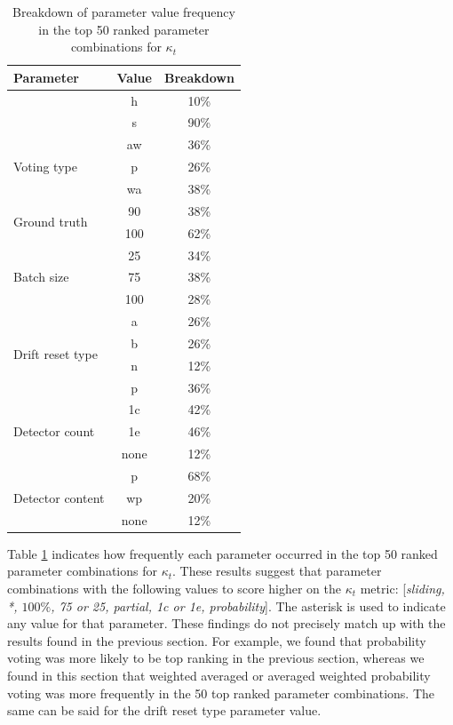 \begin{table}[]
\centering
\caption{\label{table:rank_kappa_breakdown}Breakdown of parameter value frequency in the top 50 ranked parameter combinations for $\kappa_t$}
\begin{tabular}{|l|c|c|}
\hline
\textbf{Parameter} & \textbf{Value} & \textbf{Breakdown} \\ \hline \hhline{===}
\multirow{2}{*}{Sliding type} & h & 10\% \\ \cline{2-3} 
 & s & 90\% \\ \hline
\multirow{3}{*}{Voting type} & aw & 36\% \\ \cline{2-3} 
 & p & 26\% \\ \cline{2-3} 
 & wa & 38\% \\ \hline
\multirow{2}{*}{Ground truth} & 90 & 38\% \\ \cline{2-3} 
 & 100 & 62\% \\ \hline
\multirow{3}{*}{Batch size} & 25 & 34\% \\ \cline{2-3} 
 & 75 & 38\% \\ \cline{2-3} 
 & 100 & 28\% \\ \hline
\multirow{4}{*}{Drift reset type} & a & 26\% \\ \cline{2-3} 
 & b & 26\% \\ \cline{2-3} 
 & n & 12\% \\ \cline{2-3} 
 & p & 36\% \\ \hline
\multirow{3}{*}{Detector count} & 1c & 42\% \\ \cline{2-3} 
 & 1e & 46\% \\ \cline{2-3} 
 & none & 12\% \\ \hline
\multirow{3}{*}{Detector content} & p & 68\% \\ \cline{2-3} 
 & wp & 20\% \\ \cline{2-3} 
 & none & 12\% \\ \hline
\end{tabular}
\end{table}

Table \ref{table:rank_kappa_breakdown} indicates how frequently each parameter occurred in the top 50 ranked parameter combinations for $\kappa_t$. These results suggest that parameter combinations with the following values to score higher on the $\kappa_t$ metric: [\textit{sliding, *, $100\%$, 75 or 25, partial, 1c or 1e, probability}]. The asterisk is used to indicate any value for that parameter.
These findings do not precisely match up with the results found in the previous section. For example, we found that probability voting was more likely to be top ranking in the previous section, whereas we found in this section that weighted averaged or averaged weighted probability voting was more frequently in the 50 top ranked parameter combinations. The same can be said for the drift reset type parameter value.

